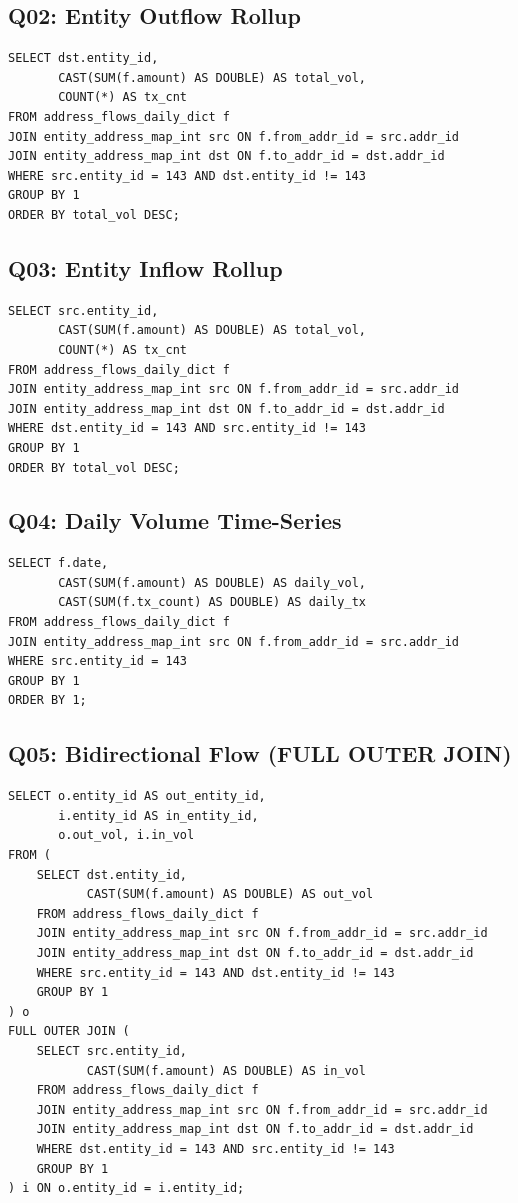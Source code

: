 \documentclass[11pt,a4paper]{article}
\begin{document}
\subsection*{Q02: Entity Outflow Rollup}

\begin{lstlisting}
SELECT dst.entity_id,
       CAST(SUM(f.amount) AS DOUBLE) AS total_vol,
       COUNT(*) AS tx_cnt
FROM address_flows_daily_dict f
JOIN entity_address_map_int src ON f.from_addr_id = src.addr_id
JOIN entity_address_map_int dst ON f.to_addr_id = dst.addr_id
WHERE src.entity_id = 143 AND dst.entity_id != 143
GROUP BY 1
ORDER BY total_vol DESC;
\end{lstlisting}

\subsection*{Q03: Entity Inflow Rollup}

\begin{lstlisting}
SELECT src.entity_id,
       CAST(SUM(f.amount) AS DOUBLE) AS total_vol,
       COUNT(*) AS tx_cnt
FROM address_flows_daily_dict f
JOIN entity_address_map_int src ON f.from_addr_id = src.addr_id
JOIN entity_address_map_int dst ON f.to_addr_id = dst.addr_id
WHERE dst.entity_id = 143 AND src.entity_id != 143
GROUP BY 1
ORDER BY total_vol DESC;
\end{lstlisting}

\subsection*{Q04: Daily Volume Time-Series}

\begin{lstlisting}
SELECT f.date,
       CAST(SUM(f.amount) AS DOUBLE) AS daily_vol,
       CAST(SUM(f.tx_count) AS DOUBLE) AS daily_tx
FROM address_flows_daily_dict f
JOIN entity_address_map_int src ON f.from_addr_id = src.addr_id
WHERE src.entity_id = 143
GROUP BY 1
ORDER BY 1;
\end{lstlisting}

\subsection*{Q05: Bidirectional Flow (FULL OUTER JOIN)}

\begin{lstlisting}
SELECT o.entity_id AS out_entity_id,
       i.entity_id AS in_entity_id,
       o.out_vol, i.in_vol
FROM (
    SELECT dst.entity_id,
           CAST(SUM(f.amount) AS DOUBLE) AS out_vol
    FROM address_flows_daily_dict f
    JOIN entity_address_map_int src ON f.from_addr_id = src.addr_id
    JOIN entity_address_map_int dst ON f.to_addr_id = dst.addr_id
    WHERE src.entity_id = 143 AND dst.entity_id != 143
    GROUP BY 1
) o
FULL OUTER JOIN (
    SELECT src.entity_id,
           CAST(SUM(f.amount) AS DOUBLE) AS in_vol
    FROM address_flows_daily_dict f
    JOIN entity_address_map_int src ON f.from_addr_id = src.addr_id
    JOIN entity_address_map_int dst ON f.to_addr_id = dst.addr_id
    WHERE dst.entity_id = 143 AND src.entity_id != 143
    GROUP BY 1
) i ON o.entity_id = i.entity_id;
\end{lstlisting}
\end{document}
